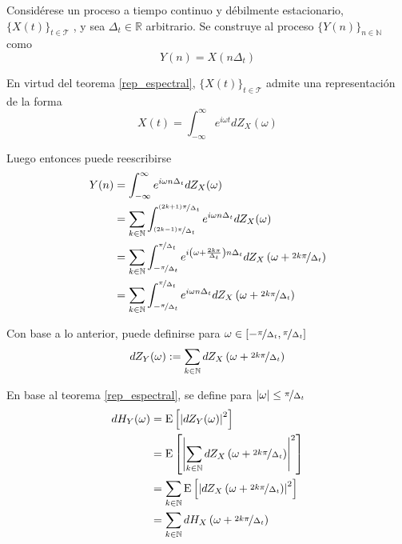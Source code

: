 \documentclass[12pt,letterpaper,draft]{book}
\newcommand{\R}{\mathbb{R}}
\newcommand{\N}{\mathbb{N}}
\newcommand{\intR}{\int_{-\infty}^{\infty}}
\newcommand{\E}[1]{\mathrm{E}\left[ #1 \right]}
\newcommand{\abso}[1]{\left| #1 \right|}
\newcommand{\xt}{$\{X(t)\}_{t\in \mathcal{T}}$ }
\begin{document}
Considérese un proceso a tiempo continuo y débilmente estacionario, \xt, y sea $\Delta_t \in \R$ arbitrario.
%
Se construye al proceso $\{Y(n)\}_{n\in \mathbb{N}}$ como
\begin{equation}
Y(n) = X(n \Delta_t)
\end{equation}

En virtud del teorema \ref{rep_espectral}, \xt admite una representación de la forma
\begin{equation}
X(t) = \intR e^{i \omega t }  dZ_X(\omega)
\end{equation}

Luego entonces puede reescribirse
\begin{align}
Y(n) &= \intR e^{i \omega n \Delta_t} dZ_X(\omega) \nonumber \\
&= \sum_{k \in \N} \int_{\nicefrac{(2k-1)\pi}{\Delta_t}}^{\nicefrac{(2k+1)\pi}{\Delta_t}}
e^{i \omega n \Delta_t} dZ_X(\omega) \nonumber \\
&= \sum_{k \in \N} \int_{-\nicefrac{\pi}{\Delta_t}}^{\nicefrac{\pi}{\Delta_t}}
e^{i \left( \omega + \frac{2 k \pi}{\Delta_t} \right) n \Delta_t}
dZ_X\left( \omega + \nicefrac{2 k \pi}{\Delta_t}\right) \nonumber \\
&= \sum_{k \in \N} \int_{-\nicefrac{\pi}{\Delta_t}}^{\nicefrac{\pi}{\Delta_t}}
e^{i \omega n \Delta_t}
dZ_X\left( \omega + \nicefrac{2 k \pi}{\Delta_t}\right)
\end{align}

Con base a lo anterior, puede definirse para 
$\omega \in \left[ -\nicefrac{\pi}{\Delta_t} , \nicefrac{\pi}{\Delta_t} \right]$
\begin{equation}
dZ_Y(\omega) := \sum_{k \in \N} dZ_X\left( \omega + \nicefrac{2 k \pi}{\Delta_t}\right)
\end{equation}

En base al teorema \ref{rep_espectral}, se define para 
$\abso{\omega} \leq \nicefrac{\pi}{\Delta_t}$
\begin{align}
dH_Y(\omega) &= \E{\abso{dZ_Y(\omega)}^{2}} \nonumber \\
&= \E{\abso{\sum_{k \in \N} dZ_X\left( \omega + \nicefrac{2 k \pi}{\Delta_t}\right)}^{2}}
\nonumber \\
&= \sum_{k \in \N} \E{\abso{dZ_X\left( \omega + \nicefrac{2 k \pi}{\Delta_t}\right)}^{2}}
\nonumber \\
&= \sum_{k \in \N} dH_X\left( \omega + \nicefrac{2 k \pi}{\Delta_t}\right)
\end{align}
\end{document}
